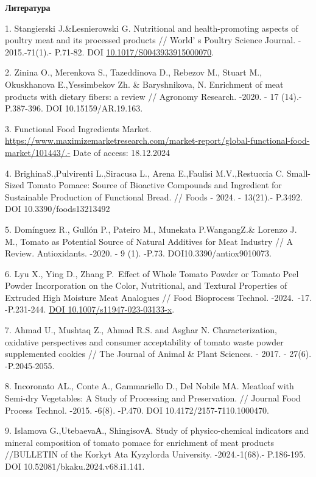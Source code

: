{\bfseries Литература}

1. Stangierski J.\&Lesnierowski G. Nutritional and health-promoting
aspects of poultry meat and its processed products //
World' s Poultry Science Journal. - 2015.-71(1).-
P.71-82. DOI
\href{http://dx.doi.org/10.1017/S0043933915000070}{10.1017/S0043933915000070}.

2. Zinina O., Merenkova S., Tazeddinova D., Rebezov M., Stuart M.,
Okuskhanova E.,Yessimbekov Zh. \& Baryshnikova, N. Enrichment of meat
products with dietary fibers: a review // Agronomy Research. -2020. - 17
(14).- P.387-396. DOI 10.15159/AR.19.163.

3. Functional Food Ingredients Market.
\url{https://www.maximizemarketresearch.com/market-report/global-functional-food-market/101443/.-}
Date of access: 18.12.2024

4. BrighinaS.,Pulvirenti L.,Siracusa L., Arena E.,Faulisi M.V.,Restuccia
C. Small-Sized Tomato Pomace: Source of Bioactive Compounds and
Ingredient for Sustainable Production of Functional Bread. // Foods -
2024. - 13(21).- P.3492. DOI 10.3390/foods13213492

5. Domínguez R., Gullón P., Pateiro M., Munekata P.WangangZ.\& Lorenzo
J. M., Tomato as Potential Source of Natural Additives for Meat Industry
// A Review. Antioxidants. -2020. - 9 (1). -P.73.
DOI10.3390/antiox9010073.

6. Lyu X., Ying D., Zhang P.~Effect of Whole Tomato Powder or Tomato
Peel Powder Incorporation on the Color, Nutritional, and Textural
Properties of Extruded High Moisture Meat Analogues // Food Bioprocess
Technol. -2024.~-17. -P.231-244.
\href{https://doi.org/10.1007/s11947-023-03133-x}{DOI
10.1007/s11947-023-03133-x}.

7. Ahmad U., Mushtaq Z., Ahmad R.S. and Asghar N. Characterization,
oxidative perspectives and consumer acceptability of tomato waste powder
supplemented cookies // The Journal of Animal \& Plant Sciences. - 2017.
- 27(6). -P.2045-2055.

8. Incoronato AL., Conte A., Gammariello D., Del Nobile MA. Meatloaf
with Semi-dry Vegetables: A Study of Processing and Preservation. //
Journal Food Process Technol. -2015. -6(8). -P.470. DOI
10.4172/2157-7110.1000470.

9. Islamova G.,UtebaevaА., ShingisovА. Study of physico-chemical
indicators and mineral composition of tomato pomace for enrichment of
meat products //BULLETIN of the Korkyt Ata Kyzylorda University.
-2024.-1(68).- P.186-195. DOI 10.52081/bkaku.2024.v68.i1.141.

